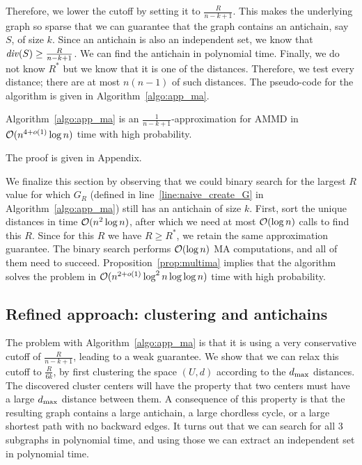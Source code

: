 Therefore, we lower the cutoff by setting it to $\frac{R}{n-k+1}$. This makes the underlying graph
so sparse that we can guarantee that the graph contains an antichain, say $S$, of size $k$.
Since an antichain is also an independent set, we know that $\diver{S} \geq \frac{R}{n-k+1}$.
We can find the antichain in polynomial time. Finally, we do not know $R^*$ but we know that it
is one of the distances. Therefore, we test every distance; there are at most $n(n - 1)$ of such distances.
The pseudo-code for the algorithm is given in Algorithm~\ref{algo:app_ma}.


\begin{theorem}
\label{thm:naivemaxanti}
Algorithm~\ref{algo:app_ma} is an $\frac{1}{n-k+1}$-approximation for AMMD in $\mathcal{O}(n^{4 + o(1)} \log n)$ time with high probability.
\end{theorem}

The proof is given in Appendix.

We finalize this section by observing that we could binary search for the largest $R$ value for which $G_R$ (defined in line~\ref{line:naive_create_G} in Algorithm~\ref{algo:app_ma}) still has an antichain of size $k$. First, sort the unique distances in time $\mathcal{O}(n^2 \log n)$, after which we need at most $\mathcal{O}(\log n)$ calls to find this $R$. Since for this $R$ we have $R \geq R^*$, we retain the same approximation guarantee. The binary search performs $\mathcal{O}(\log n)$ MA computations, and all of them need to succeed. Proposition~\ref{prop:multima} implies that the algorithm solves the problem in
$\mathcal{O}(n^{2 + o(1)}\log^2 n \log \log n)$ time with high probability.

\subsection{Refined approach: clustering and antichains}
\label{sec:approx16k}


The problem with Algorithm~\ref{algo:app_ma} is that it is using a very conservative cutoff of $\frac{R}{n-k+1}$, leading
to a weak guarantee. 
We show that we can relax this cutoff to $\frac{R}{6k}$, by first clustering the space $(U,d)$ according to the $d_{\text{max}}$ distances.
The discovered cluster centers will have the property that two centers must have a large $d_{\text{max}}$ distance between them.
A consequence of this property is that the resulting graph contains a large antichain, a large chordless cycle, or a large shortest path with no backward edges.
It turns out that we can search for all 3 subgraphs in polynomial time, and using those we can extract an independent set in polynomial time.

